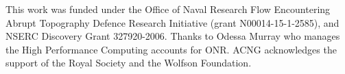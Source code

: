 \documentclass[twocol]{ametsocV5}
\begin{document}
\acknowledgments

This work was funded under the Office of Naval Research Flow Encountering Abrupt Topography Defence Research Initiative (grant N00014-15-1-2585), and NSERC Discovery Grant 327920-2006.  Thanks to Odessa Murray who manages the High Performance Computing accounts for ONR. ACNG acknowledges the support of the Royal Society and the Wolfson Foundation.


%
%
%
%
%
%






%
\end{document}
